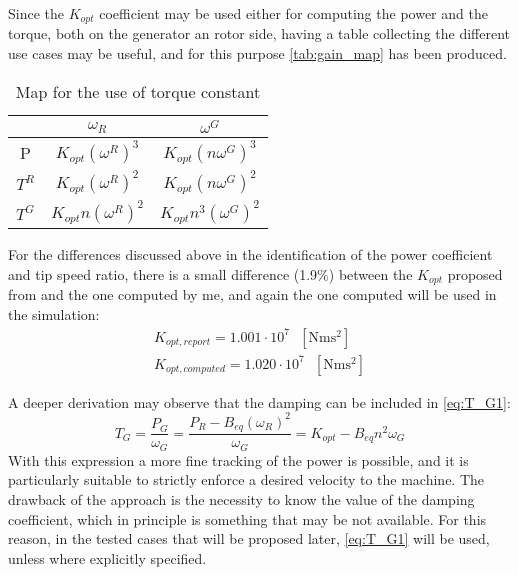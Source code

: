 Since the $K_{opt}$ coefficient may be used either for computing the power and the torque, both on the generator an rotor side, having a table collecting the different use cases may be useful, and for this purpose \autoref{tab:gain_map} has been produced.
\begin{table}[htb]
    \centering
    \caption{Map for the use of torque constant}
    \begin{tabular}{ccc}
    \toprule
         & $\omega_R$ & $\omega^G$  \\ \midrule
         P & $K_{opt} \left(\omega^{R}\right)^3$ & $K_{opt}\left(n \omega^{G}\right)^3$\\
         $T^R$ & $K_{opt} \left( \omega^{R}\right)^2$ & $K_{opt}\left(n \omega^{G}\right)^2$\\
         $T^G$ & $K_{opt} n \left(\omega^{R}\right)^2$ &  $K_{opt} n^3\left(\omega^{G}\right)^2$\\ \bottomrule
    \end{tabular}
    \label{tab:gain_map}
\end{table}

 For the differences discussed above in the identification of the power coefficient and tip speed ratio, there is a small difference (1.9$\%$) between the $K_{opt}$ proposed from \cite{DTU_Wind_Energy_Report-I-0092} and the one computed by me, and again the one computed will be used in the simulation:
 \begin{gather*}
     K_{opt, report} = 1.001 \cdot 10^7 \ \ \ \left[\si{\newton\meter\square\second}\right] \\
     K_{opt, computed} = 1.020 \cdot 10^7 \ \ \ \left[\si{\newton\meter\square\second}\right] 
 \end{gather*}

 A deeper derivation may observe that the damping can be included in \autoref{eq:T_G1}:
 \begin{equation}
  T_G = \frac{P_G}{\omega_G} = \frac{P_R-B_{eq}(\omega_R)^2}{\omega_G} = K_{opt} - B_{eq}n^2\omega_G  
  \label{eq:T_G5}
 \end{equation}
 With this expression a more fine tracking of the power is possible, and it is particularly suitable to strictly enforce a desired velocity to the machine. The drawback of the approach is the necessity to know the value of the damping coefficient, which in principle is something that may be not available. For this reason, in the tested cases that will be proposed later, \autoref{eq:T_G1} will be used, unless where explicitly specified.

